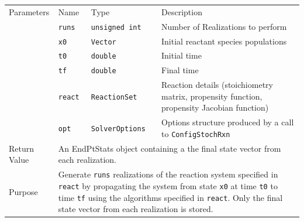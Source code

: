 \documentclass[12pt]{article}
\newcommand{\api}[1]{\texttt{#1}}
\newcommand{\srccode}[1]{\texttt{#1}}
\begin{document}
\begin{table}
\begin{center}
\begin{tabular}{|p{0.75in}|p{0.5in}|p{1.125in}|p{2.625in}|}
      \hline
      Parameters & Name & Type & Description \\
      \cline{2-4}
                 &  \srccode{runs} & \srccode{unsigned int} &
                       Number of Realizations to perform \\
                 &  \srccode{x0} & \srccode{Vector} &
                       Initial reactant species populations \\
                 &  \srccode{t0} & \srccode{double} &
                       Initial time \\
                 &  \srccode{tf} & \srccode{double} &
                       Final time \\
                 &  \srccode{react} & \srccode{ReactionSet} &
                       Reaction details (stoichiometry matrix, propensity
                       function, propensity Jacobian function) \\
                 &  \srccode{opt} & \srccode{SolverOptions} &
                       Options structure produced by a call to
                       \api{ConfigStochRxn} \\
                   \hline
      Return Value & \multicolumn{3}{p{4.5in}|}{An EndPtStats object containing a
                     the final state vector from each realization.} \\
      \hline
      Purpose & \multicolumn{3}{p{4.5in}|}{Generate \srccode{runs} realizations
                of the reaction system specified in \srccode{react} by
                propagating the system from state \srccode{x0} at time
                \srccode{t0} to time \srccode{tf} using the algorithms
                specified in \srccode{react}.  Only the final state vector
                from each realization is stored.} \\
      \hline
    \end{tabular}
  \end{center}
\end{table}
\end{document}

